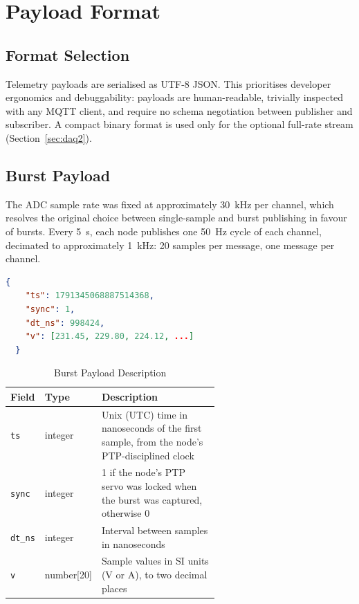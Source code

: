 \section{Payload Format}
\subsection{Format Selection}
Telemetry payloads are serialised as UTF-8 JSON. This prioritises developer ergonomics and debuggability: payloads are human-readable, trivially inspected with any MQTT client, and require no schema negotiation between publisher and subscriber. A compact binary format is used only for the optional full-rate stream (Section~\ref{sec:daq2}).

\subsection{Burst Payload}
The ADC sample rate was fixed at approximately 30~kHz per channel, which resolves the original choice between single-sample and burst publishing in favour of bursts. Every 5~s, each node publishes one 50~Hz cycle of each channel, decimated to approximately 1~kHz: 20 samples per message, one message per channel.

\begin{lstlisting}[language=json]
  {
    "ts": 1791345068887514368,
    "sync": 1,
    "dt_ns": 998424,
    "v": [231.45, 229.80, 224.12, ...]
  }
\end{lstlisting}

\begin{table}[H]
  \caption{Burst Payload Description}\label{tab:burst-payload}
  \centering
  \begin{tabular}{llp{0.6\linewidth}}
    \hline
    \textbf{Field} & \textbf{Type} & \textbf{Description} \\
    \hline
    \texttt{ts} & integer & Unix (UTC) time in nanoseconds of the first sample, from the node's PTP-disciplined clock \\
    \texttt{sync} & integer & 1 if the node's PTP servo was locked when the burst was captured, otherwise 0 \\
    \texttt{dt\_ns} & integer & Interval between samples in nanoseconds \\
    \texttt{v} & number[20] & Sample values in SI units (V or A), to two decimal places \\
    \hline
    \end{tabular}
\end{table}

